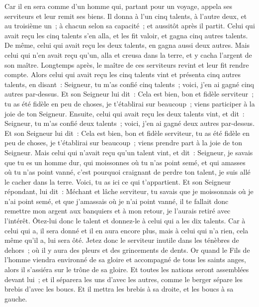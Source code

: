 \begin{multicols}{2}
Car il en sera comme d'un homme qui, partant pour un voyage, appela ses serviteurs et leur remit ses biens.
Il donna à l'un cinq talents, à l'autre deux, et au troisième un~; à chacun selon sa capacité~; et aussitôt après il partit.
Celui qui avait reçu les cinq talents s'en alla, et les fit valoir, et gagna cinq autres talents.
De même, celui qui avait reçu les deux talents, en gagna aussi deux autres.
Mais celui qui n'en avait reçu qu'un, alla et creusa dans la terre, et y cacha l'argent de son maître.
Longtemps après, le maître de ces serviteurs revint et leur fit rendre compte.
Alors celui qui avait reçu les cinq talents vint et présenta cinq autres talents, en disant~: Seigneur, tu m'as confié cinq talents~; voici, j'en ai gagné cinq autres par-dessus.
Et son Seigneur lui dit~: Cela est bien, bon et fidèle serviteur~; tu as été fidèle en peu de choses, je t'établirai sur beaucoup~; viens participer à la joie de ton Seigneur.
Ensuite, celui qui avait reçu les deux talents vint, et dit~: Seigneur, tu m'as confié deux talents~; voici, j'en ai gagné deux autres par-dessus.
Et son Seigneur lui dit~: Cela est bien, bon et fidèle serviteur, tu as été fidèle en peu de choses, je t'établirai sur beaucoup~; viens prendre part à la joie de ton Seigneur.
Mais celui qui n'avait reçu qu'un talent vint, et dit~: Seigneur, je savais que tu es un homme dur, qui moissonnes où tu n'as point semé, et qui amasses où tu n'as point vanné,
c'est pourquoi craignant de perdre ton talent, je suis allé le cacher dans la terre. Voici, tu as ici ce qui t'appartient.
Et son Seigneur répondant, lui dit~: Méchant et lâche serviteur, tu savais que je moissonnais où je n'ai point semé, et que j'amassais où je n'ai point vanné,
il te fallait donc remettre mon argent aux banquiers et à mon retour, je l'aurais retiré avec l'intérêt.
Ôtez-lui donc le talent et donnez-le à celui qui a les dix talents.
Car à celui qui a, il sera donné et il en aura encore plus, mais à celui qui n'a rien, cela même qu'il a, lui sera ôté.
Jetez donc le serviteur inutile dans les ténèbres de dehors~; où il y aura des pleurs et des grincements de dents.
Or quand le Fils de l'homme viendra environné de sa gloire et accompagné de tous les saints anges, alors il s'assiéra sur le trône de sa gloire.
Et toutes les nations seront assemblées devant lui~; et il séparera les uns d'avec les autres, comme le berger sépare les brebis d'avec les boucs.
Et il mettra les brebis à sa droite, et les boucs à sa gauche.

\end{multicols}
